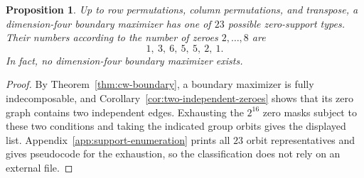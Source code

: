 \documentclass[10pt,a4paper]{amsart}
\newtheorem{proposition}[theorem]{Proposition}
\theoremstyle{definition}
\theoremstyle{remark}
\begin{document}
\begin{proposition}\label{prop:dittert-n4-supports}
Up to row permutations, column permutations, and transpose, a
dimension-four boundary maximizer has one of \(23\) possible zero-support
types.  Their numbers according to the number of zeroes \(2,\ldots,8\) are
\[
 1,\ 3,\ 6,\ 5,\ 5,\ 2,\ 1.
\]
In fact, no dimension-four boundary maximizer exists.
\end{proposition}

\begin{proof}
By Theorem~\ref{thm:cw-boundary}, a boundary maximizer is fully
indecomposable, and Corollary~\ref{cor:two-independent-zeroes} shows that
its zero graph contains two independent edges.  Exhausting the \(2^{16}\)
zero masks subject to these two conditions and taking the indicated group
orbits gives the displayed list.  Appendix~\ref{app:support-enumeration}
prints all \(23\) orbit representatives and gives pseudocode for the
exhaustion, so the classification does not rely on an external file.


\end{proof}
\end{document}

